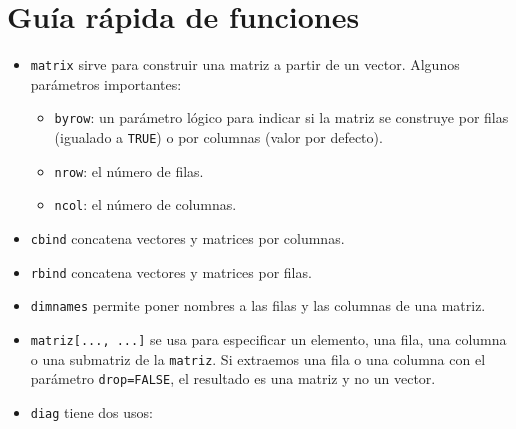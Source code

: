 \documentclass[
]{book}
\providecommand{\tightlist}{%
  \setlength{\itemsep}{0pt}\setlength{\parskip}{0pt}}
\theoremstyle{definition}
\theoremstyle{definition}
\theoremstyle{definition}
\theoremstyle{remark}
\begin{document}
\hypertarget{guuxeda-ruxe1pida-de-funciones-1}{%
\section{Guía rápida de funciones}\label{guuxeda-ruxe1pida-de-funciones-1}}

\begin{itemize}
\tightlist
\item
  \texttt{matrix} sirve para construir una matriz a partir de un vector. Algunos parámetros importantes:

  \begin{itemize}
  \tightlist
  \item
    \texttt{byrow}: un parámetro lógico para indicar si la matriz se construye por filas (igualado a \texttt{TRUE}) o por columnas (valor por defecto).
  \item
    \texttt{nrow}: el número de filas.
  \item
    \texttt{ncol}: el número de columnas.
  \end{itemize}
\item
  \texttt{cbind} concatena vectores y matrices por columnas.
\item
  \texttt{rbind} concatena vectores y matrices por filas.
\item
  \texttt{dimnames} permite poner nombres a las filas y las columnas de una matriz.
\item
  \texttt{matriz{[}...,\ ...{]}} se usa para especificar un elemento, una fila, una columna o una submatriz de la \texttt{matriz}. Si extraemos una fila o una columna con el parámetro \texttt{drop=FALSE}, el resultado es una matriz y no un vector.
\item
  \texttt{diag} tiene dos usos:


\end{itemize}
\end{document}
